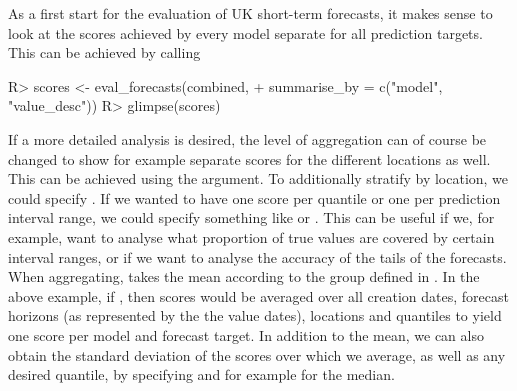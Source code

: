 \documentclass[article]{jss}
\newcommand{\fct}[1]{\code{#1()}}
\begin{document}
As a first start for the evaluation of UK short-term forecasts, it makes sense to look at the scores achieved by every model separate for all prediction targets. This can be achieved by calling
% 
\begin{Schunk}
\begin{Sinput}
R> scores <- eval_forecasts(combined, 
+                           summarise_by = c("model", "value_desc"))
R> glimpse(scores)
\end{Sinput}
\end{Schunk}
% 
If a more detailed analysis is desired, the level of aggregation can of course be changed to show for example separate scores for the different locations as well. This can be achieved using the  argument. To additionally stratify by location, we could specify . If we wanted to have one score per quantile or one per prediction interval range, we could specify something like  or . This can be useful if we, for example, want to analyse what proportion of true values are covered by certain interval ranges, or if we want to analyse the accuracy of the tails of the forecasts. When aggregating, \fct{eval\_forecasts} takes the mean according to the group defined in . In the above example, if , then scores would be averaged over all creation dates, forecast horizons (as represented by the the value dates), locations and quantiles to yield one score per model and forecast target. In addition to the mean, we can also obtain the standard deviation of the scores over which we average, as well as any desired quantile, by specifying  and for example  for the median. 
\end{document}
